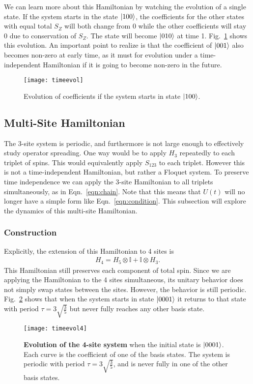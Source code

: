 We can learn more about this Hamiltonian by watching the evolution of a single state. If the system starts in the state $\left|100\right\rangle$, the coefficients for the other states with equal total $S_Z$ will both change from 0 while the other coefficients will stay 0 due to conservation of $S_Z$.
The state will become $\left|010\right\rangle$ at time 1. Fig.~\ref{fig:timeevol} shows this evolution. An important point to realize is that the coefficient of $\left|001\right\rangle$ also becomes non-zero at early time, as it must for evolution under a time-independent Hamiltonian if it is going to become non-zero in the future. 
\begin{figure}
	\centering
	\texttt{[image: timeevol]}
	\caption{Evolution of coefficients if the system starts in state $\left|100\right\rangle$.}
	\label{fig:timeevol}
\end{figure}

\subsection{Multi-Site Hamiltonian} \label{sub:multistate}

The 3-site system is periodic, and furthermore is not large enough to effectively study operator spreading. One way would be to apply $H_3$ repeatedly to each triplet of spins. This would equivalently apply $S_{123}$ to each triplet. However this is not a time-independent Hamiltonian, but rather a Floquet system. To preserve time independence we can apply the 3-site Hamiltonian to all triplets simultaneously, as in Eqn.~\ref{eqn:chain}. Note that this means that $U(t)$ will no longer have a simple form like Eqn.~\ref{eqn:condition}. This subsection will explore the dynamics of this multi-site Hamiltonian.

\subsubsection{Construction} \label{subsub:construction} 

Explicitly, the extension of this Hamiltonian to 4 sites is
\begin{align}
H_4 = H_5\otimes\mathbb{I} + \mathbb{I}\otimes H_3.
\end{align}
This Hamiltonian still preserves each component of total spin. Since we are applying the Hamiltonian to the 4 sites simultaneous, its unitary behavior does not simply swap states between the sites. However, the behavior is still periodic. Fig.~\ref{fig:timeevol4} shows that when the system starts in state $\left|0001\right\rangle$ it returns to that state with period $\tau=3\sqrt{\frac{3}{5}}$ but never fully reaches any other basis state.
\begin{figure}
\centering
\texttt{[image: timeevol4]}
\caption{\textbf{Evolution of the 4-site system} when the initial state is $\left|0001\right\rangle$. Each curve is the coefficient of one of the basis states. The system is periodic with period $\tau=3\sqrt{\frac{3}{5}}$, and is never fully in one of the other basis states.}
\label{fig:timeevol4}
\end{figure}

